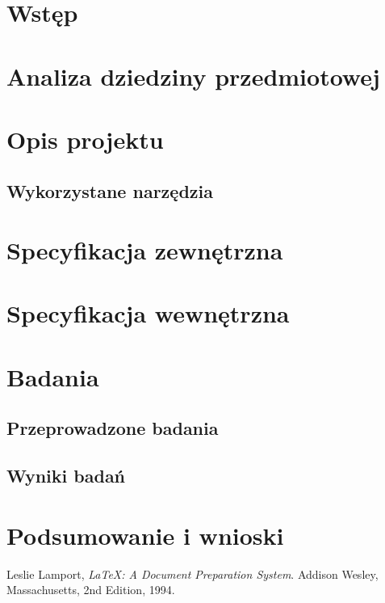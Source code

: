 \documentclass[12pt,a4paper,twoside,openright]{report}
\begin{document}
    \chapter{Wstęp}
        
    \chapter{Analiza dziedziny przedmiotowej}
        
    \chapter{Opis projektu}
        \section{Wykorzystane narzędzia}
    \chapter{Specyfikacja zewnętrzna}
        \blindtext
    \chapter{Specyfikacja wewnętrzna}
        \blindtext
    \chapter{Badania}
        \blindtext
        \section{Przeprowadzone badania}
        \section{Wyniki badań}
    \chapter{Podsumowanie i wnioski}
        \blindtext
    \begin{thebibliography}{9}
            Leslie Lamport,
            \emph{\LaTeX: A Document Preparation System}.
            Addison Wesley, Massachusetts,
            2nd Edition,
            1994.
    \end{thebibliography}
\end{document}
